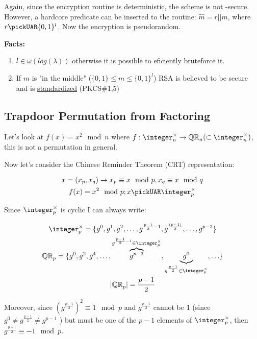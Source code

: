 Again, since the encryption routine is deterministic, the scheme is not \cpa-secure. However, a hardcore predicate can be inserted to the routine: $\hat{m} = r||m$, where $r \pickUAR \{0, 1\}^l$. Now the encryption is pseudorandom.

\textbf{Facts:}
\begin{enumerate}
    \item $l \in \omega(log(\lambda))$ otherwise it is possible to eficiently bruteforce it.
    \item If $m$ is "in the middle" ($\{0,1\} \leq m \leq \{0, 1\}^l$) RSA is believed to be secure and is \underline{standardized} (PKCS\#1,5)
\end{enumerate}


\subsection{Trapdoor Permutation from Factoring}
Let's look at $f(x) = x^2\mod{n}$ where $f: \integer_n^\times \to \QR[n] (\subset \integer_n^\times)$, this is not a permutation in general.

Now let's consider the Chinese Reminder Theorem (CRT) representation:

\begin{gather*}
    x=(x_p,x_q) \rightarrow x_p\equiv x\mod{p} , x_q\equiv x\mod{q}\\
    f(x)=x^2\mod{p}; x \pickUAR \integer_p^\times
\end{gather*}

Since $\integer_p^\times$ is cyclic I can always write:

\begin{gather*}
    \integer_p^\times = \{g^0,g^1,g^2,\ldots,g^{\frac{p-1}{2}-1},g^{\frac{(p-1)}{2}},\ldots,g^{p-2} \} \\
    \QR[p]=\{g^0,g^2,g^4,\ldots,\overbrace{g^{p-3}}^{g^{\frac{p-1}{2}-1} \in \integer_p^\times},\underbrace{g^0}_{g^{\frac{p-1}{2}} \in \integer_p^\times},\ldots\} \\
    |\QR[p]|=\frac{p-1}{2}
\end{gather*}

Moreover, since $(g^{\frac{p-1}{2}})^2 \equiv 1 \mod{p} $ and $g^{\frac{p-1}{2}}$ cannot be 1 (since $g^{0}\not=g^{\frac{p-1}{2}}\not=g^{p-1}$ ) but must be one of the $p-1$ elements of $\integer_p^\times$, then $g^{\frac{p-1}{2}} \equiv -1 \mod{p}$.

